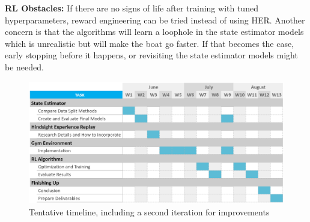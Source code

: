 \textbf{RL Obstacles:} 
If there are no signs of life after training with tuned hyperparameters, reward engineering can be tried instead of using HER. Another concern is that the algorithms will learn a loophole in the state estimator models which is unrealistic but will make the boat go faster. If that becomes the case, early stopping before it happens, or revisiting the state estimator models might be needed.

\begin{figure}[h]
\centering
\includegraphics[width = 0.9\hsize]{figures/gantt-chart.png}
\caption{Tentative timeline, including a second iteration for improvements}
\label{fig:gantt-chart}
\end{figure}

